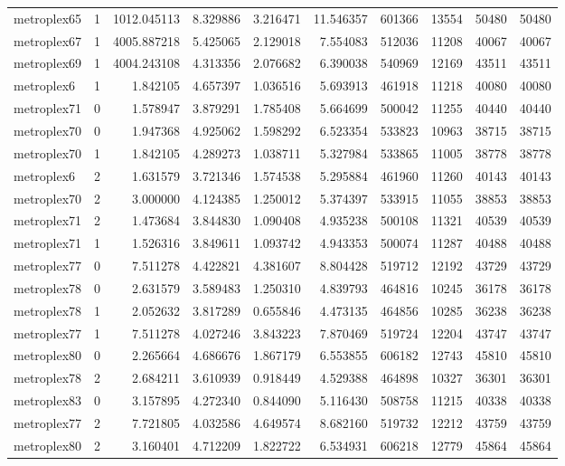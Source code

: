 \begin{longtable}{|l|r|r|r|r|r|r|r|r|r|}
metroplex65 & 1 & 1012.045113 & 8.329886 & 3.216471 & 11.546357 & 601366 & 13554 & 50480 & 50480 \\
metroplex67 & 1 & 4005.887218 & 5.425065 & 2.129018 & 7.554083 & 512036 & 11208 & 40067 & 40067 \\
metroplex69 & 1 & 4004.243108 & 4.313356 & 2.076682 & 6.390038 & 540969 & 12169 & 43511 & 43511 \\
metroplex6 & 1 & 1.842105 & 4.657397 & 1.036516 & 5.693913 & 461918 & 11218 & 40080 & 40080 \\
metroplex71 & 0 & 1.578947 & 3.879291 & 1.785408 & 5.664699 & 500042 & 11255 & 40440 & 40440 \\
metroplex70 & 0 & 1.947368 & 4.925062 & 1.598292 & 6.523354 & 533823 & 10963 & 38715 & 38715 \\
metroplex70 & 1 & 1.842105 & 4.289273 & 1.038711 & 5.327984 & 533865 & 11005 & 38778 & 38778 \\
metroplex6 & 2 & 1.631579 & 3.721346 & 1.574538 & 5.295884 & 461960 & 11260 & 40143 & 40143 \\
metroplex70 & 2 & 3.000000 & 4.124385 & 1.250012 & 5.374397 & 533915 & 11055 & 38853 & 38853 \\
metroplex71 & 2 & 1.473684 & 3.844830 & 1.090408 & 4.935238 & 500108 & 11321 & 40539 & 40539 \\
metroplex71 & 1 & 1.526316 & 3.849611 & 1.093742 & 4.943353 & 500074 & 11287 & 40488 & 40488 \\
metroplex77 & 0 & 7.511278 & 4.422821 & 4.381607 & 8.804428 & 519712 & 12192 & 43729 & 43729 \\
metroplex78 & 0 & 2.631579 & 3.589483 & 1.250310 & 4.839793 & 464816 & 10245 & 36178 & 36178 \\
metroplex78 & 1 & 2.052632 & 3.817289 & 0.655846 & 4.473135 & 464856 & 10285 & 36238 & 36238 \\
metroplex77 & 1 & 7.511278 & 4.027246 & 3.843223 & 7.870469 & 519724 & 12204 & 43747 & 43747 \\
metroplex80 & 0 & 2.265664 & 4.686676 & 1.867179 & 6.553855 & 606182 & 12743 & 45810 & 45810 \\
metroplex78 & 2 & 2.684211 & 3.610939 & 0.918449 & 4.529388 & 464898 & 10327 & 36301 & 36301 \\
metroplex83 & 0 & 3.157895 & 4.272340 & 0.844090 & 5.116430 & 508758 & 11215 & 40338 & 40338 \\
metroplex77 & 2 & 7.721805 & 4.032586 & 4.649574 & 8.682160 & 519732 & 12212 & 43759 & 43759 \\
metroplex80 & 2 & 3.160401 & 4.712209 & 1.822722 & 6.534931 & 606218 & 12779 & 45864 & 45864 \\

\end{longtable}
